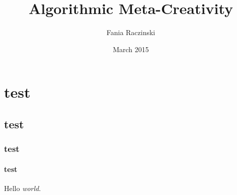 \documentclass[11pt]{thesis} %
\title{Algorithmic Meta-Creativity}
\author{Fania Raczinski}
\date{March 2015}
\begin{document}
\section{test}
\lipsum[2]
\subsection{test}
\lipsum[2]
\subsubsection{test}
\lipsum[2]
\paragraph{test}
Hello \emph{world}.
\end{document}
